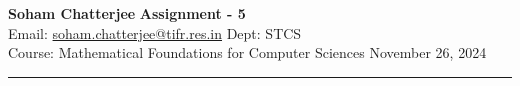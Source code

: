 \documentclass[a4paper, 11pt]{article}
\begin{document}
	
	
	{\noindent \large\textbf{Soham Chatterjee} \hfill \textbf{Assignment - 5}\\
		Email: \href{soham.chatterjee@tifr.res.in}{soham.chatterjee@tifr.res.in} \hfill Dept: STCS\\
		\normalsize Course: Mathematical Foundations for Computer Sciences \hfill November 26, 2024\\ 
		\noindent\rule{7in}{2.8pt}}
	
	
\end{document}
